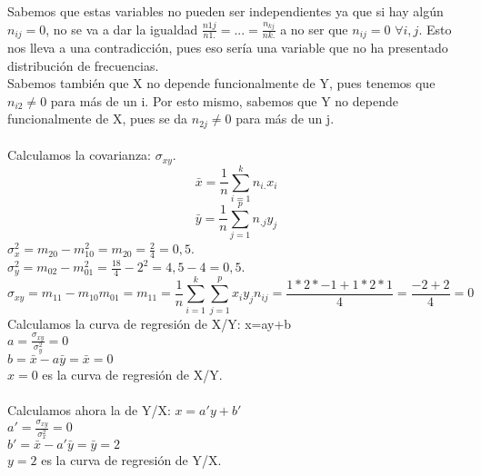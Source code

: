 \documentclass{article}
\begin{document}
    Sabemos que estas variables no pueden ser independientes ya que si hay algún $n_{ij}=0$, no se va a dar la igualdad $\frac{n1j}{n1.} = ... = \frac{n_{kj}}{nk.}$ a no ser que $n_{ij}=0$ $\forall i,j$. Esto nos lleva a una contradicción, pues eso sería una variable que no ha presentado distribución de frecuencias. \\
    Sabemos también que X no depende funcionalmente de Y, pues tenemos que $n_{i2} \not = 0$ para más de un i. Por esto mismo, sabemos que Y no depende funcionalmente de X, pues se da $n_{2j} \neq 0$ para más de un j. \\ \\
    Calculamos la covarianza: $\sigma_{xy}$.\\
    \[\bar{x}=\frac{1}{n}\sum_{i=1}^{k}n_{i.}x_i\] 
    \[\bar{y}=\frac{1}{n}\sum_{j=1}^{p}n_{.j}y_j\]
    $\sigma_x^2 = m_{20}-m_{10}^2 = m_{20} = \frac{2}{4} = 0,5$. \\
    $\sigma_y^2 = m_{02}-m_{01}^2 = \frac{18}{4} -2^2=4,5 - 4 = 0,5$. \\
    \[\sigma_{xy} = m_{11} - m_{10}m_{01} = m_{11} = \frac{1}{n} \sum_{i=1}^{k}\sum_{j=1}^{p} x_iy_jn_{ij} = \frac{1*2*-1 + 1*2*1}{4} = \frac{-2+2}{4} = 0 \]
    Calculamos la curva de regresión de X/Y: x=ay+b \\
    $a= \frac{\sigma_{xy}}{\sigma_{y}^2} = 0$ \\
    $b = \bar{x}-a\bar{y} = \bar{x} = 0$ \\ 
    $x=0$ es la curva de regresión de X/Y. \\ \\
    Calculamos ahora la de Y/X: $x=a'y+b'$ \\
    $a' = \frac{\sigma_{xy}}{\sigma_x^2} = 0$ \\
    $b' = \bar{x}-a'\bar{y} = \bar{y} = 2$ \\
    $y=2$ es la curva de regresión de Y/X. \\ \\
    
\end{document}
